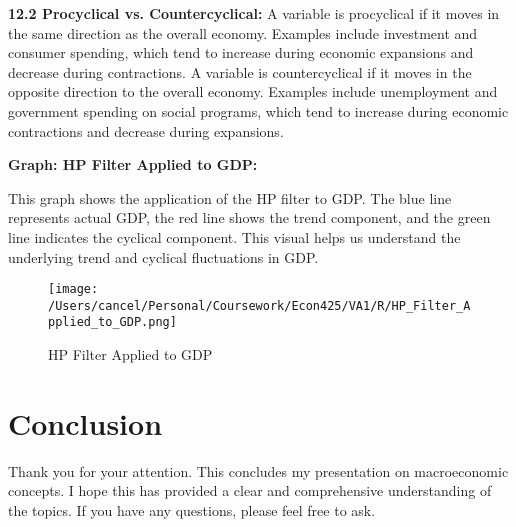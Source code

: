 \documentclass{article}
\begin{document}
\textbf{12.2 Procyclical vs. Countercyclical:} A variable is procyclical if it moves in the same direction as the overall economy. Examples include investment and consumer spending, which tend to increase during economic expansions and decrease during contractions. A variable is countercyclical if it moves in the opposite direction to the overall economy. Examples include unemployment and government spending on social programs, which tend to increase during economic contractions and decrease during expansions.

\textbf{Graph: HP Filter Applied to GDP:} 

This graph shows the application of the HP filter to GDP. The blue line represents actual GDP, the red line shows the trend component, and the green line indicates the cyclical component. This visual helps us understand the underlying trend and cyclical fluctuations in GDP.

\begin{figure}[h!]
    \centering
    \texttt{[image: /Users/cancel/Personal/Coursework/Econ425/VA1/R/HP\_Filter\_Applied\_to\_GDP.png]}
    \caption{HP Filter Applied to GDP}
\end{figure}

\hrulefill

\section{Conclusion}

Thank you for your attention. This concludes my presentation on macroeconomic concepts. I hope this has provided a clear and comprehensive understanding of the topics. If you have any questions, please feel free to ask.
\end{document}
